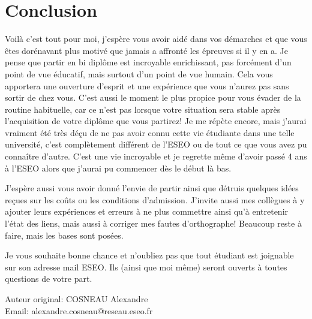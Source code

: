 \chapter{Conclusion}\label{ch:conclusion}

Voilà c'est tout pour moi, j'espère vous avoir aidé dans vos démarches et que vous êtes dorénavant plus motivé que jamais a affronté les épreuves si il y en a. Je pense que partir en bi diplôme est incroyable enrichissant, pas forcément d'un point de vue éducatif, mais surtout d'un point de vue humain. Cela vous apportera une ouverture d'esprit et une expérience que vous n'aurez pas sans sortir de chez vous. C'est aussi le moment le plus propice pour vous évader de la routine habituelle, car ce n'est pas lorsque votre situation sera stable après l'acquisition de votre diplôme que vous partirez! Je me répète encore, mais j'aurai vraiment été très déçu de ne pas avoir connu cette vie étudiante dans une telle université, c'est complètement différent de l'ESEO ou de tout ce que vous avez pu connaître d'autre. C'est une vie incroyable et je regrette même d'avoir passé 4 ans à l'ESEO alors que j'aurai pu commencer dès le début là bas.

J'espère aussi vous avoir donné l'envie de partir ainsi que détruis quelques idées reçues sur les coûts ou les conditions d'admission. J'invite aussi mes collègues à y ajouter leurs expériences et erreurs à ne plus commettre ainsi qu'à entretenir l'état des liens, mais aussi à corriger mes fautes d'orthographe! Beaucoup reste à faire, mais les bases sont posées.

Je vous souhaite bonne chance et n'oubliez pas que tout étudiant est joignable sur son adresse mail ESEO. Ils (ainsi que moi même) seront ouverts à toutes questions de votre part.

\begin{center}
  Auteur original: COSNEAU Alexandre\\
  Email: alexandre.cosneau@reseau.eseo.fr\\
\end{center}
